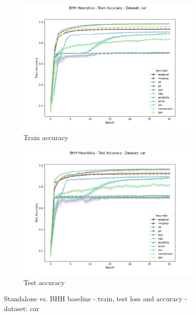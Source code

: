 \begin{figure}[htbp]
	\begin{subfigure}{0.5\textwidth}
    	\centering
        \includegraphics[width=\textwidth]{analysis/standalone/figures/train/accuracy/car.png}
        \caption{Train accuracy}
        \label{fig:results:standalone:figures:accuracy:train:car}
	\end{subfigure}
	\begin{subfigure}{0.5\textwidth}
    	\centering
        \includegraphics[width=\textwidth]{analysis/standalone/figures/test/accuracy/car.png}
        \caption{Test accuracy}
        \label{fig:results:standalone:figures:accuracy:test:car}
	\end{subfigure}
	\par\bigskip
	\caption{Standalone vs. \Acs{BHH} baseline - train, test loss and accuracy - dataset: car}
	\label{fig:results:standalone:figures:car}
\end{figure}

